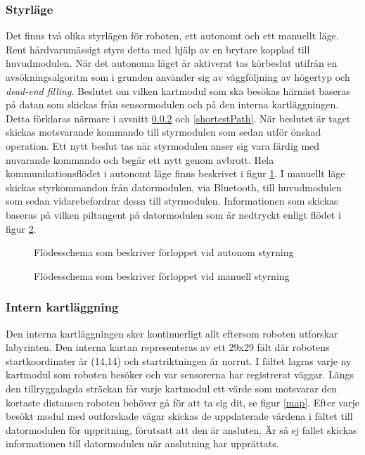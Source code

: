 \documentclass[11pt]{article}
\begin{document}
\begin{flushleft}
\subsubsection{Styrläge}
Det finns två olika styrlägen för roboten, ett autonomt och ett manuellt läge. Rent hårdvarumässigt styrs detta med hjälp av en brytare kopplad till huvudmodulen. När det autonoma läget är aktiverat tas körbeslut utifrån en avsökningsalgoritm som i grunden använder sig av väggföljning av högertyp och \emph{dead-end filling}. Beslutet om vilken kartmodul som ska besökas härnäst baseras på datan som skickas från sensormodulen och på den interna kartläggningen. Detta förklaras närmare i avsnitt \ref{search} och \ref{shortestPath}. När beslutet är taget skickas motsvarande kommando till styrmodulen som sedan utför önskad operation. Ett nytt beslut tas när styrmodulen anser sig vara färdig med nuvarande kommando och begär ett nytt genom avbrott. Hela kommunikationsflödet i autonomt läge finns beskrivet i figur \ref{autonomousMode}. I manuellt läge skickas styrkommandon från datormodulen, via Bluetooth\textsuperscript{\circledR}, till huvudmodulen som sedan vidarebefordrar dessa till styrmodulen. Informationen som skickas baseras på vilken piltangent på datormodulen som är nedtryckt enligt flödet i figur \ref{manualMode}.

\begin{figure}[htbp]
\centering
\noindent\resizebox{0.9\linewidth}{!}{
	}
	\cprotect\caption{Flödesschema som beskriver förloppet vid autonom styrning \label{autonomousMode}}	
\end{figure}

\begin{figure}[htbp]
\centering
\noindent\resizebox{0.9\linewidth}{!}{
	}
	\cprotect\caption{Flödesschema som beskriver förloppet vid manuell styrning \label{manualMode}}	
\end{figure}

\subsubsection{Intern kartläggning} \label{search}
Den interna kartläggningen sker kontinuerligt allt eftersom roboten utforskar labyrinten. Den interna kartan representeras av ett 29x29 fält där robotens startkoordinater är (14,14) och startriktningen är norrut. I fältet lagras varje ny kartmodul som roboten besöker och var sensorerna har registrerat väggar. Längs den tillryggalagda sträckan får varje kartmodul ett värde som motsvarar den kortaste distansen roboten behöver gå för att ta sig dit, se figur \ref{map}. Efter varje besökt modul med outforskade vägar skickas de uppdaterade värdena i fältet till datormodulen för uppritning, förutsatt att den är ansluten. Är så ej fallet skickas informationen till datormodulen när anslutning har upprättats. 


\end{flushleft}
\end{document}
